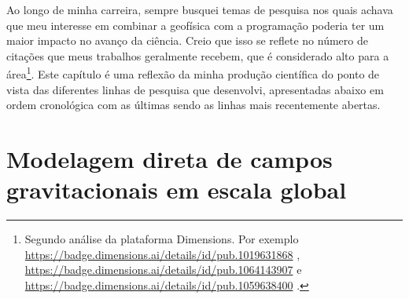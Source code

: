 \documentclass[12pt,a4paper,oneside]{book}
\begin{document}
Ao longo de minha carreira, sempre busquei temas de pesquisa nos quais achava
que meu interesse em combinar a geofísica com a programação poderia ter um
maior impacto no avanço da ciência.
Creio que isso se reflete no número de citações que meus trabalhos geralmente
recebem, que é considerado alto para a área\footnote{Segundo análise da
  plataforma Dimensions. Por exemplo
  \url{https://badge.dimensions.ai/details/id/pub.1019631868} \citep{Uieda2012},
  \url{https://badge.dimensions.ai/details/id/pub.1064143907} \citep{Uieda2016} e
  \url{https://badge.dimensions.ai/details/id/pub.1059638400} \citep{Uieda2017}.
}.
Este capítulo é uma reflexão da minha produção científica do ponto de vista das
diferentes linhas de pesquisa que desenvolvi, apresentadas abaixo em ordem
cronológica com as últimas sendo as linhas mais recentemente abertas.

\section{Modelagem direta de campos gravitacionais em escala global}
\label{sec_modelagemdireta}
\end{document}
